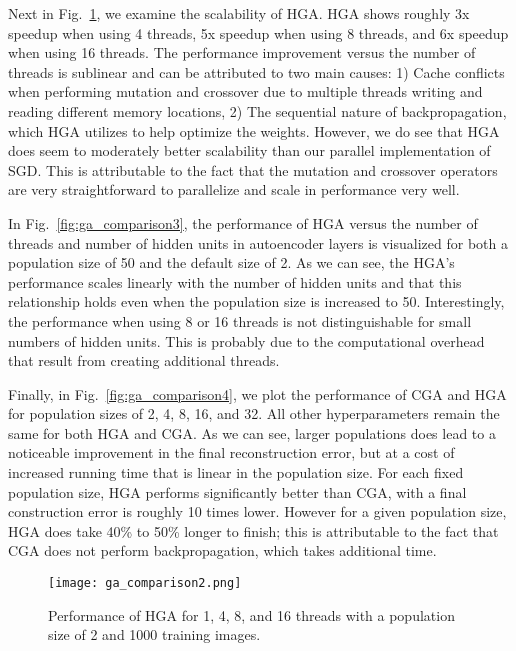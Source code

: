 Next in Fig.~\ref{fig:ga_comparison2}, we examine the scalability of HGA. HGA shows roughly 3x speedup when using 4 threads, 5x speedup when using 8 threads, and 6x speedup when using 16 threads. The performance improvement versus the number of threads is sublinear and can be attributed to two main causes: 1) Cache conflicts when performing mutation and crossover due to multiple threads writing and reading different memory locations, 2) The sequential nature of backpropagation, which HGA utilizes to help optimize the weights. However, we do see that HGA does seem to moderately better scalability than our parallel implementation of SGD. This is attributable to the fact that the mutation and crossover operators are very straightforward to parallelize and scale in performance very well. 

In Fig.~\ref{fig:ga_comparison3}, the performance of HGA versus the number of threads and number of hidden units in autoencoder layers is visualized for both a population size of 50 and the default size of 2. As we can see, the HGA's performance scales linearly with the number of hidden units and that this relationship holds even when the population size is increased to 50. Interestingly, the performance when using 8 or 16 threads is not distinguishable for small numbers of hidden units. This is probably due to the computational overhead that result from creating additional threads.

Finally, in Fig.~\ref{fig:ga_comparison4}, we plot the performance of CGA and HGA for population sizes of 2, 4, 8, 16, and 32. All other hyperparameters remain the same for both HGA and CGA. As we can see, larger populations does lead to a noticeable improvement in the final reconstruction error, but at a cost of increased running time that is linear in the population size. For each fixed population size, HGA performs significantly better than CGA, with a final construction error is roughly 10 times lower. However for a given population size, HGA does take 40\% to 50\% longer to finish; this is attributable to the fact that CGA does not perform backpropagation, which takes additional time. 

\begin{figure}[h] \centering
  \texttt{[image: ga\_comparison2.png]}
  \caption{Performance of HGA for 1, 4, 8, and 16 threads with a population size of 2 and 1000 training images.}
  \label{fig:ga_comparison2}
\end{figure}

\begin{figure*}[h]
  \centering
  \caption{Comparison of performance versus number of threads and number of hidden units in autoencoder layer for HGA with population size (a) 2 and (b) 50.}
  \label{fig:ga_comparison3}
\end{figure*}

